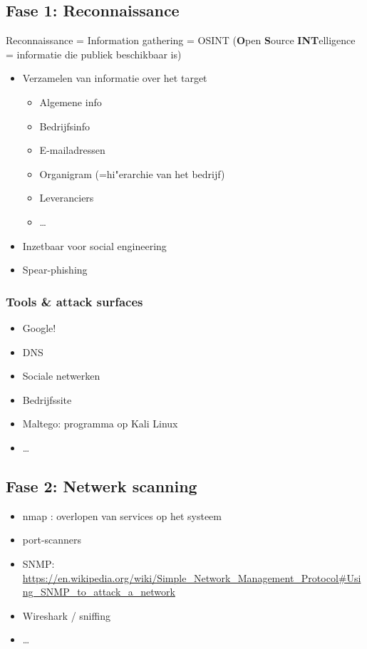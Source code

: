 \documentclass{article}
\newcommand{\bold}[1]{\textbf{#1}}
\begin{document}
\subsection{Fase 1: Reconnaissance}

Reconnaissance = Information gathering = OSINT (\bold{O}pen \bold{S}ource \bold{INT}elligence = informatie die publiek beschikbaar is)

\begin{itemize}
    \item Verzamelen van informatie over het target
    \begin{itemize}
        \item Algemene info
        \item Bedrijfsinfo
        \item E-mailadressen
        \item Organigram (=hi"erarchie van het bedrijf)
        \item Leveranciers
        \item \dots
    \end{itemize}
    \item Inzetbaar voor social engineering
    \item Spear-phishing
\end{itemize}

\subsubsection{Tools \& attack surfaces}

\begin{itemize}
    \item Google!
    \item DNS
    \item Sociale netwerken
    \item Bedrijfssite
    \item Maltego: programma op Kali Linux
    \item \dots
\end{itemize}

\subsection{Fase 2: Netwerk scanning}

\begin{itemize}
    \item nmap : overlopen van services op het systeem
    \item port-scanners
    \item SNMP: \url{https://en.wikipedia.org/wiki/Simple\_Network\_Management\_Protocol#Using\_SNMP\_to\_attack\_a\_network}
    \item Wireshark / sniffing
    \item \dots
\end{itemize}
\end{document}
